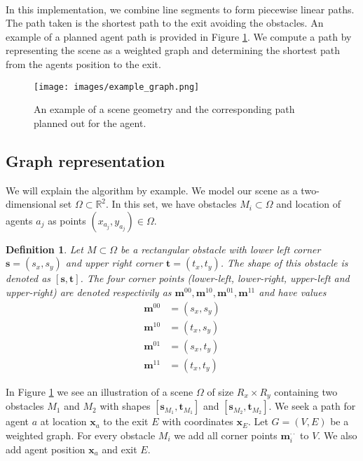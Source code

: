 \documentclass{article}
\renewcommand{\vec}[1]{\mathbf{#1}}
\newtheorem{newdef}{Definition}
\begin{document}
\ \\
In this implementation, we combine line segments to form piecewise linear paths. The path taken is the shortest path to the exit avoiding the obstacles. An example of a planned agent path is provided in Figure \ref{fig:example_path}. We compute a path by representing the scene as a weighted graph and determining the shortest path from the agents position to the exit.
\begin{figure}[h]
	\centering
	\texttt{[image: images/example\_graph.png]}
	\caption{An example of a scene geometry and the corresponding path planned out for the agent.}
	\label{fig:example_path}
\end{figure}
\subsection{Graph representation}
We will explain the algorithm by example. We model our scene as a two-dimensional set $\Omega \subset \mathbb{R}^2$. In this set, we have obstacles $M_i \subset \Omega$ and location of agents $a_j$ as points $(x_{a_j},y_{a_j}) \in \Omega$. 
\begin{newdef}
	Let $M \subset \Omega$ be a rectangular obstacle with lower left corner $\vec{s}=(s_x,s_y)$ and upper right corner $\vec{t}=(t_x,t_y)$. The shape of this obstacle is denoted as $[\vec{s},\vec{t}]$. The four corner points (lower-left, lower-right, upper-left and upper-right) are denoted respectivily as $\vec{m}^{00},\vec{m}^{10},\vec{m}^{01},\vec{m}^{11}$ and have values
	\begin{align}
		\vec{m}^{00}&=(s_x,s_y)\\
		\vec{m}^{10}&=(t_x,s_y)\\
		\vec{m}^{01}&=(s_x,t_y)\\
		\vec{m}^{11}&=(t_x,t_y)
		\label{eq:corner_points}
	\end{align}
\end{newdef}
In Figure \ref{fig:example_path} we see an illustration of a scene $\Omega$ of size $R_x\times R_y$ containing two obstacles $M_1$ and $M_2$ with shapes $[\vec{s}_{M_1},\vec{t}_{M_1}]$ and $[\vec{s}_{M_2},\vec{t}_{M_2}]$. We seek a path for agent $a$ at location $\vec{x}_a$ to the exit $E$ with coordinates $\vec{x}_E$. 
Let $G = (V,E)$ be a weighted graph. For every obstacle $M_i$ we add all corner points $\vec{m}_i^{\cdot\cdot}$ to $V$. We also add agent position $\vec{x}_a$ and exit $E$.
\end{document}
